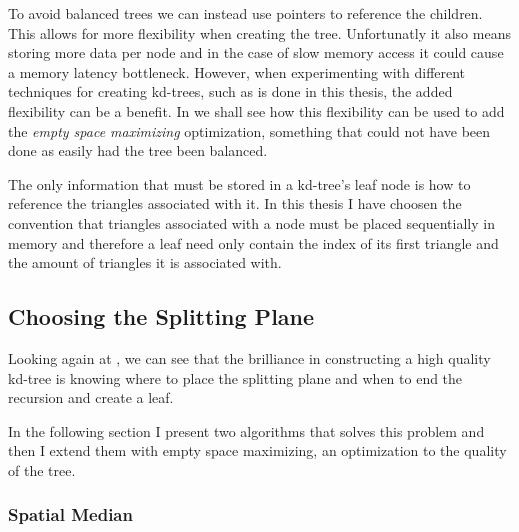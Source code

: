
To avoid balanced trees we can instead use pointers to reference the
children. This allows for more flexibility when creating the tree.
Unfortunatly it also means storing more data per node and in the case
of slow memory access it could cause a memory latency
bottleneck. However, when experimenting with different techniques for
creating kd-trees, such as is done in this thesis, the added
flexibility can be a benefit. In  we
shall see how this flexibility can be used to add the \textit{empty
  space maximizing} optimization, something that could not have been
done as easily had the tree been balanced.


The only information that must be stored in a kd-tree's leaf node is
how to reference the triangles associated with it. In this thesis I
have choosen the convention that triangles associated with a node must
be placed sequentially in memory and therefore a leaf need only
contain the index of its first triangle and the amount of triangles it
is associated with.



\subsection{Choosing the Splitting Plane}\label{sec:splittingPlane}


Looking again at , we can see that the
brilliance in constructing a high quality kd-tree is knowing where to
place the splitting plane and when to end the recursion and create a
leaf.


In the following section I present two algorithms that solves this
problem and then I extend them with empty space maximizing, an
optimization to the quality of the tree.


\subsubsection{Spatial Median}

